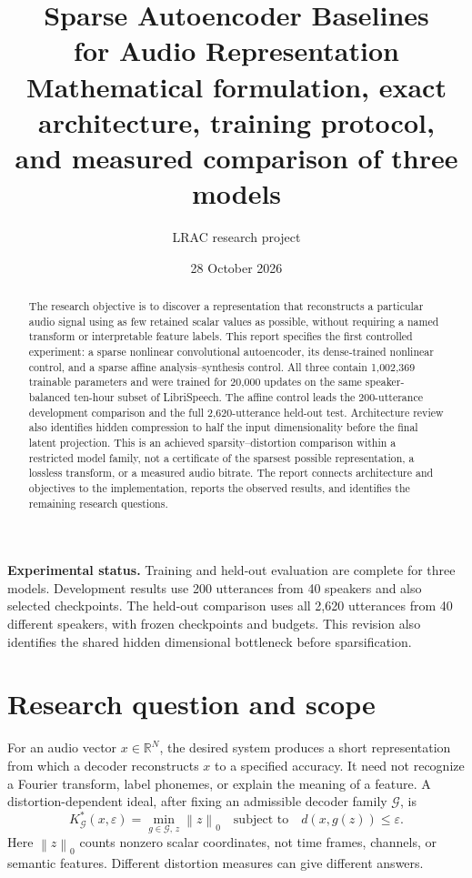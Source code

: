 \documentclass[11pt,a4paper]{article}
\title{\textcolor{ink}{Sparse Autoencoder Baselines\\for Audio Representation}\\[6pt]\large Mathematical formulation, exact architecture, training protocol,\\and measured comparison of three models}
\author{LRAC research project}
\date{28 October 2026}
\newcommand{\R}{\mathbb{R}}
\newcommand{\norm}[1]{\left\lVert#1\right\rVert}
\newcommand{\code}[1]{\texttt{\small\detokenize{#1}}}
\begin{document}
\maketitle
\begin{abstract}
The research objective is to discover a representation that reconstructs a particular audio signal using as few retained scalar values as possible, without requiring a named transform or interpretable feature labels. This report specifies the first controlled experiment: a sparse nonlinear convolutional autoencoder, its dense-trained nonlinear control, and a sparse affine analysis--synthesis control. All three contain 1,002,369 trainable parameters and were trained for 20,000 updates on the same speaker-balanced ten-hour subset of LibriSpeech. The affine control leads the 200-utterance development comparison and the full 2,620-utterance held-out test. Architecture review also identifies hidden compression to half the input dimensionality before the final latent projection. This is an achieved sparsity--distortion comparison within a restricted model family, not a certificate of the sparsest possible representation, a lossless transform, or a measured audio bitrate. The report connects architecture and objectives to the implementation, reports the observed results, and identifies the remaining research questions.
\end{abstract}
\vspace{4pt}
\colorbox{paperblue}{\parbox{\dimexpr\linewidth-2\fboxsep\relax}{\textbf{Experimental status.} Training and held-out evaluation are complete for three models. Development results use 200 utterances from 40 \code{dev-clean} speakers and also selected checkpoints. The held-out comparison uses all 2,620 \code{test-clean} utterances from 40 different speakers, with frozen checkpoints and budgets. This revision also identifies the shared hidden dimensional bottleneck before sparsification.}}
\newpage
{\small\setlength{\parskip}{0pt}\tableofcontents}
\newpage

\section{Research question and scope}
For an audio vector $x\in\R^N$, the desired system produces a short representation from which a decoder reconstructs $x$ to a specified accuracy. It need not recognize a Fourier transform, label phonemes, or explain the meaning of a feature. A distortion-dependent ideal, after fixing an admissible decoder family $\mathcal G$, is
\begin{equation}
 K^*_{\mathcal G}(x,\varepsilon)=\min_{g\in\mathcal G,\,z}\norm{z}_0
 \quad\text{subject to}\quad d(x,g(z))\leq\varepsilon.
 \label{eq:ideal}
\end{equation}
Here $\norm{z}_0$ counts nonzero scalar coordinates, not time frames, channels, or semantic features. Different distortion measures can give different answers.
\end{document}
